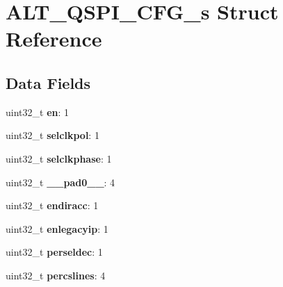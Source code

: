 \hypertarget{structALT__QSPI__CFG__s}{}\section{A\+L\+T\+\_\+\+Q\+S\+P\+I\+\_\+\+C\+F\+G\+\_\+s Struct Reference}
\label{structALT__QSPI__CFG__s}
\subsection*{Data Fields}
\begin{DoxyCompactItemize}
\item 
\mbox{\label{structALT__QSPI__CFG__s_a1da8cd1ab134d9a8ad71a39fee051fad}} 
uint32\+\_\+t {\bfseries en}\+: 1
\item 
\mbox{\label{structALT__QSPI__CFG__s_ae4ef0543b10758a391ceff209d283e0b}} 
uint32\+\_\+t {\bfseries selclkpol}\+: 1
\item 
\mbox{\label{structALT__QSPI__CFG__s_aa45c9a276368024015fd70d2379b2ff9}} 
uint32\+\_\+t {\bfseries selclkphase}\+: 1
\item 
\mbox{\label{structALT__QSPI__CFG__s_a1ed13a5aca2b29c4aab56e408624b73b}} 
uint32\+\_\+t {\bfseries \+\_\+\+\_\+pad0\+\_\+\+\_\+}\+: 4
\item 
\mbox{\label{structALT__QSPI__CFG__s_adfd8707cb25e4f678e631fcb56ad39be}} 
uint32\+\_\+t {\bfseries endiracc}\+: 1
\item 
\mbox{\label{structALT__QSPI__CFG__s_a7dda635c30a232bc0cb98744ed85f111}} 
uint32\+\_\+t {\bfseries enlegacyip}\+: 1
\item 
\mbox{\label{structALT__QSPI__CFG__s_a11e213d16fb1e1b5d350797eddc7d726}} 
uint32\+\_\+t {\bfseries perseldec}\+: 1
\item 
\mbox{\label{structALT__QSPI__CFG__s_a534184a0448330c654d2965e27daf485}} 
uint32\+\_\+t {\bfseries percslines}\+: 4
\item 
\mbox{\label{structALT__QSPI__CFG__s_af33d3a5a036c39a2ae5bba44089d2a60}} 

\end{DoxyCompactItemize}
